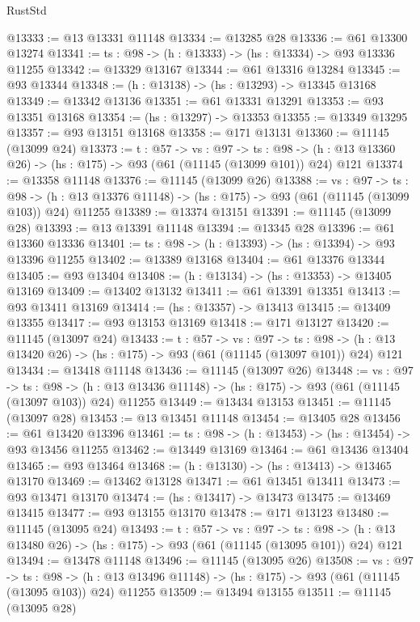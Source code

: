 \begin{lexlean}{RustStd}
\begin{coremodule}
@13333 := @13 @13331 @11148
@13334 := @13285 @28
@13336 := @61 @13300 @13274
@13341 := {ts : @98} -> (h : @13333) -> (hs : @13334) -> @93 @13336 @11255
@13342 := @13329 @13167
@13344 := @61 @13316 @13284
@13345 := @93 @13344
@13348 := (h : @13138) -> (hs : @13293) -> @13345 @13168
@13349 := @13342 @13136
@13351 := @61 @13331 @13291
@13353 := @93 @13351 @13168
@13354 := (hs : @13297) -> @13353
@13355 := @13349 @13295
@13357 := @93 @13151 @13168
@13358 := @171 @13131
@13360 := @11145 (@13099 @24)
@13373 := {t : @57} ->
  {vs : @97} ->
  {ts : @98} -> (h : @13 @13360 @26) -> (hs : @175) -> @93 (@61 (@11145 (@13099 @101)) @24) @121
@13374 := @13358 @11148
@13376 := @11145 (@13099 @26)
@13388 := {vs : @97} ->
  {ts : @98} ->
  (h : @13 @13376 @11148) -> (hs : @175) -> @93 (@61 (@11145 (@13099 @103)) @24) @11255
@13389 := @13374 @13151
@13391 := @11145 (@13099 @28)
@13393 := @13 @13391 @11148
@13394 := @13345 @28
@13396 := @61 @13360 @13336
@13401 := {ts : @98} -> (h : @13393) -> (hs : @13394) -> @93 @13396 @11255
@13402 := @13389 @13168
@13404 := @61 @13376 @13344
@13405 := @93 @13404
@13408 := (h : @13134) -> (hs : @13353) -> @13405 @13169
@13409 := @13402 @13132
@13411 := @61 @13391 @13351
@13413 := @93 @13411 @13169
@13414 := (hs : @13357) -> @13413
@13415 := @13409 @13355
@13417 := @93 @13153 @13169
@13418 := @171 @13127
@13420 := @11145 (@13097 @24)
@13433 := {t : @57} ->
  {vs : @97} ->
  {ts : @98} -> (h : @13 @13420 @26) -> (hs : @175) -> @93 (@61 (@11145 (@13097 @101)) @24) @121
@13434 := @13418 @11148
@13436 := @11145 (@13097 @26)
@13448 := {vs : @97} ->
  {ts : @98} ->
  (h : @13 @13436 @11148) -> (hs : @175) -> @93 (@61 (@11145 (@13097 @103)) @24) @11255
@13449 := @13434 @13153
@13451 := @11145 (@13097 @28)
@13453 := @13 @13451 @11148
@13454 := @13405 @28
@13456 := @61 @13420 @13396
@13461 := {ts : @98} -> (h : @13453) -> (hs : @13454) -> @93 @13456 @11255
@13462 := @13449 @13169
@13464 := @61 @13436 @13404
@13465 := @93 @13464
@13468 := (h : @13130) -> (hs : @13413) -> @13465 @13170
@13469 := @13462 @13128
@13471 := @61 @13451 @13411
@13473 := @93 @13471 @13170
@13474 := (hs : @13417) -> @13473
@13475 := @13469 @13415
@13477 := @93 @13155 @13170
@13478 := @171 @13123
@13480 := @11145 (@13095 @24)
@13493 := {t : @57} ->
  {vs : @97} ->
  {ts : @98} -> (h : @13 @13480 @26) -> (hs : @175) -> @93 (@61 (@11145 (@13095 @101)) @24) @121
@13494 := @13478 @11148
@13496 := @11145 (@13095 @26)
@13508 := {vs : @97} ->
  {ts : @98} ->
  (h : @13 @13496 @11148) -> (hs : @175) -> @93 (@61 (@11145 (@13095 @103)) @24) @11255
@13509 := @13494 @13155
@13511 := @11145 (@13095 @28)

\end{coremodule}
\end{lexlean}
